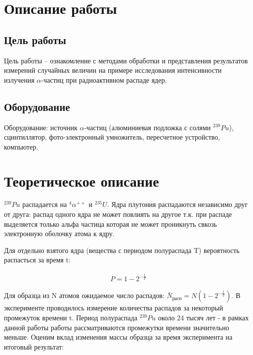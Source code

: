 \documentclass[a4paper,14pt]{article}
\begin{document}

\tableofcontents    
\newpage            

\section{Описание работы}
\subsection{Цель работы}
Цель работы – ознакомление с методами обработки и представления
результатов измерений случайных величин на примере исследования интенсивности излучения $\alpha$-частиц при радиоактивном распаде ядер.

\subsection{Оборудование}
Оборудование: источник $\alpha$-частиц (алюминиевая подложка с солями $ ^{239}Pu$), сцинтиллятор, фото-электронный умножитель, пересчетное устройство, компьютер.



\section{Теоретическое описание}
 $ ^{239}Pu$ распадается на $^4\alpha^{++}$ и $^{235}U$. Ядра плутония распадаются независимо друг от друга: распад одного ядра не может повлиять на другое т.к.
при распаде выделяется только альфа частица которая не может проникнуть свкозь электронную оболочку атома к ядру.

Для отдельно взятого ядра (вещества с периодом полураспада T) вероятность распасться за время t:

\begin{equation}
\begin{aligned}
P = 1 - 2^{-\frac{t}{T}}
 \label{eq:prob1}
 \end{aligned}
\end{equation}

Для образца из N атомов ожидаемое число распадов: $\bar{N}_{\text{расп}} = N(1 - 2^{-\frac{t}{T}})$.
В эксперименте проводилось измерение количества распадов за некоторый промежуток времени t.
Период полураспада $ ^{239}Pu$ около 24 тысяч лет - в рамках
данной работы работы рассматриваются промежутки времени значительно меньше. Оценим вклад изменения массы образца за время эксперимента на итоговый результат:
\end{document}
